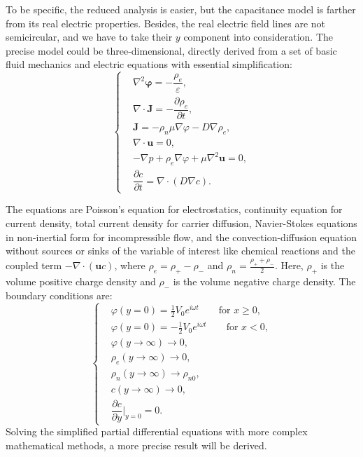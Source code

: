 \documentclass[journal,svgnames,twocolumn,x11names]{IEEEtran}
\begin{document}
To be specific, the reduced analysis is easier, but the capacitance model is farther from its real electric properties. Besides, the real electric field lines are not semicircular, and we have to take their $y$ component into consideration. The precise model could be three-dimensional, directly derived from a set of basic fluid mechanics and electric equations with essential simplification:
\begin{equation}
    \left\{
        \begin{aligned}%
            &\nabla^2\mathbf{\varphi}=-\dfrac{\rho_e}{\varepsilon},\\%
            &\nabla\cdot\mathbf{J}=-\dfrac{\partial\rho_e}{\partial t},\\%
            &\mathbf{J}=-\rho_n\mu\nabla\varphi-D\nabla\rho_e,\\
            &\nabla\cdot\mathbf{u}=0,\\
            &-\nabla p+\rho_e\nabla\varphi+\mu\nabla^2\mathbf{u}=0,\\
            &\dfrac{\partial c}{\partial t}=\nabla\cdot(D\nabla c).
        \end{aligned}
    \right.
\end{equation}

The equations are Poisson's equation for electrostatics, continuity equation for current density, total current density for carrier diffusion, Navier-Stokes equations in non-inertial form for incompressible flow, and the convection-diffusion equation without sources or sinks of the variable of interest like chemical reactions and the coupled term $-\nabla\cdot(\mathbf{u}c)$, where $\rho_e=\rho_+-\rho_-$ and $\rho_n=\frac{\rho_++\rho_-}{2}$. Here, $\rho_+$ is the volume positive charge density and $\rho_-$ is the volume negative charge density. The boundary conditions are:
\begin{equation}
    \left\{
        \begin{aligned}
            &\varphi(y=0)=\frac{1}{2}V_0e^{i\omega t}\qquad\text{for }x\geq0,\\
            &\varphi(y=0)=-\frac{1}{2}V_0e^{i\omega t}\qquad\text{for }x<0,\\
            &\varphi(y\rightarrow\infty)\rightarrow0,\\
            &\rho_e(y\rightarrow\infty)\rightarrow0,\\
            &\rho_n(y\rightarrow\infty)\rightarrow\rho_{n0},\\
            &c(y\rightarrow\infty)\rightarrow0,\\
            &\dfrac{\partial c}{\partial y}\bigg|_{y=0}=0.
        \end{aligned}
    \right.
\end{equation}
Solving the simplified partial differential equations with more complex mathematical methods, a more precise result will be derived.
\end{document}
